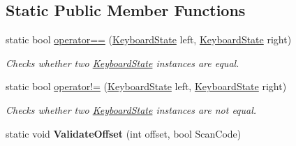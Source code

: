 \subsection*{Static Public Member Functions}
\begin{DoxyCompactItemize}
\item 
static bool \hyperlink{struct_open_t_k_1_1_input_1_1_keyboard_state_abaf52efe90ec70ac0f268bdd4b33d9ca}{operator==} (\hyperlink{struct_open_t_k_1_1_input_1_1_keyboard_state}{Keyboard\-State} left, \hyperlink{struct_open_t_k_1_1_input_1_1_keyboard_state}{Keyboard\-State} right)
\begin{DoxyCompactList}\small\item\em Checks whether two \hyperlink{struct_open_t_k_1_1_input_1_1_keyboard_state}{Keyboard\-State} instances are equal. \end{DoxyCompactList}\item 
static bool \hyperlink{struct_open_t_k_1_1_input_1_1_keyboard_state_aea747029dc303914c8b96be5713bd78c}{operator!=} (\hyperlink{struct_open_t_k_1_1_input_1_1_keyboard_state}{Keyboard\-State} left, \hyperlink{struct_open_t_k_1_1_input_1_1_keyboard_state}{Keyboard\-State} right)
\begin{DoxyCompactList}\small\item\em Checks whether two \hyperlink{struct_open_t_k_1_1_input_1_1_keyboard_state}{Keyboard\-State} instances are not equal. \end{DoxyCompactList}\item 
\hypertarget{struct_open_t_k_1_1_input_1_1_keyboard_state_ae8c6e2da3601f6c367d3eb62b6159512}{static void {\bfseries Validate\-Offset} (int offset, bool Scan\-Code)}\label{struct_open_t_k_1_1_input_1_1_keyboard_state_ae8c6e2da3601f6c367d3eb62b6159512}

\end{DoxyCompactItemize}
